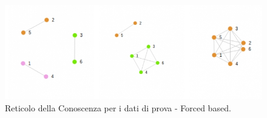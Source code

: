 \begin{figure}[H]
\centering
	\includegraphics[width=1\linewidth]{./image/collage_reticolo-general-forced.png}
	\caption{Reticolo della Conoscenza per i dati di prova - Forced based.}
	\label{Reticolo della Conoscenza per i dati di prova - Forced based.}
\end{figure}
\noindent


